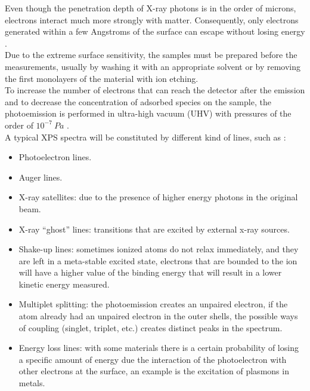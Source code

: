 Even though the penetration depth of X-ray photons is in the order of microns, electrons interact much more strongly with matter. Consequently, only electrons generated within a few Angstroms of the surface can escape without losing energy \cite{wattsIntroductionSurfaceAnalysis2003}.
\\
Due to the extreme surface sensitivity, the samples must be prepared before the measurements, usually by washing it with an appropriate solvent or by removing the first monolayers of the material with ion etching.
\\
To increase the number of electrons that can reach the detector after the emission and to decrease the concentration of adsorbed species on the sample, the photoemission is performed in ultra-high vacuum (UHV) with pressures of the order of $10^{-7} \: Pa$ \cite{wattsIntroductionSurfaceAnalysis2003}.
\\
A typical XPS spectra will be constituted by different kind of lines, such as \cite{moulderHandbookXrayPhotoelectron1992}:
\begin{itemize}
    \item Photoelectron lines.
    \item Auger lines.
    \item X-ray satellites: due to the presence of higher energy photons in the original beam.
    \item X-ray “ghost” lines: transitions that are excited by external x-ray sources.
    \item Shake-up lines: sometimes ionized atoms do not relax immediately, and they are left in a meta-stable excited state, electrons that are bounded to the ion will have a higher value of the binding energy that will result in a lower kinetic energy measured.
    \item Multiplet splitting: the photoemission creates an unpaired electron, if the atom already had an unpaired electron in the outer shells, the possible ways of coupling (singlet, triplet, etc.) creates distinct peaks in the spectrum.
    \item Energy loss lines: with some materials there is a certain probability of losing a specific amount of energy due the interaction of the photoelectron with other electrons at the surface, an example is the excitation of plasmons in metals.
\end{itemize}
